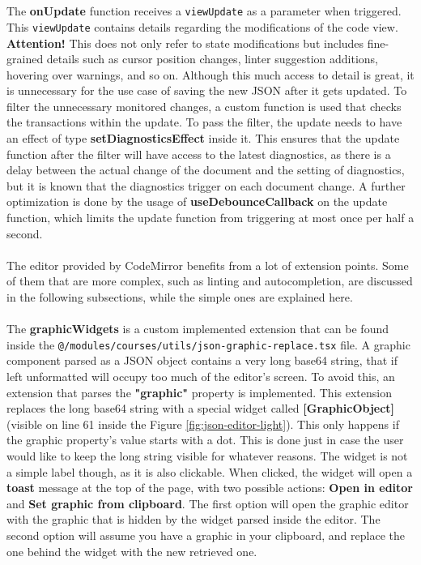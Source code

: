 \\\\
\noindent The \textbf{onUpdate} function receives a \texttt{viewUpdate} as a parameter when triggered. This \texttt{viewUpdate} contains details regarding the modifications of the code view. \textbf{Attention!} This does not only refer to state modifications but includes fine-grained details such as cursor position changes, linter suggestion additions, hovering over warnings, and so on. Although this much access to detail is great, it is unnecessary for the use case of saving the new JSON after it gets updated. To filter the unnecessary monitored changes, a custom function is used that checks the transactions within the update. To pass the filter, the update needs to have an effect of type \textbf{setDiagnosticsEffect} inside it. This ensures that the update function after the filter will have access to the latest diagnostics, as there is a delay between the actual change of the document and the setting of diagnostics, but it is known that the diagnostics trigger on each document change. A further optimization is done by the usage of \textbf{useDebounceCallback} on the update function, which limits the update function from triggering at most once per half a second.
\\\\
\noindent The editor provided by CodeMirror benefits from a lot of extension points. Some of them that are more complex, such as linting and autocompletion, are discussed in the following subsections, while the simple ones are explained here.
\\\\
\noindent The \textbf{graphicWidgets} is a custom implemented extension that can be found inside the \texttt{@/modules/courses/utils/json-graphic-replace.tsx} file. A graphic component parsed as a JSON object contains a very long base64 string, that if left unformatted will occupy too much of the editor's screen. To avoid this, an extension that parses the \textbf{"graphic"} property is implemented. This extension replaces the long base64 string with a special widget called \textbf{[GraphicObject]} (visible on line 61 inside the Figure \ref{fig:json-editor-light}). This only happens if the graphic property's value starts with a dot. This is done just in case the user would like to keep the long string visible for whatever reasons. The widget is not a simple label though, as it is also clickable. When clicked, the widget will open a \textbf{toast} message at the top of the page, with two possible actions: \textbf{Open in editor} and \textbf{Set graphic from clipboard}. The first option will open the graphic editor with the graphic that is hidden by the widget parsed inside the editor. The second option will assume you have a graphic in your clipboard, and replace the one behind the widget with the new retrieved one.
